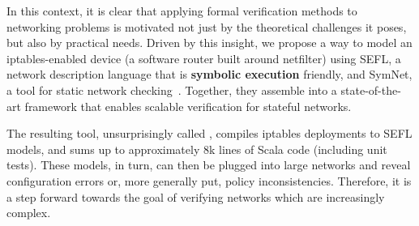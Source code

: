 In this context, it is clear that applying formal verification methods to
networking problems is motivated not just by the theoretical challenges it
poses, but also by practical needs.  Driven by this insight, we propose a way
to model an iptables-enabled device (a software router built around netfilter)
using SEFL, a network
description language that is \textbf{symbolic execution} friendly, and SymNet,
a tool for static network checking~\cite{stoenescu2016symnet,
stoenescu2013symnet}.  Together, they assemble into a state-of-the-art
framework that enables scalable verification for stateful networks.

The resulting tool, unsurprisingly called \TOOL, compiles iptables deployments
to SEFL models, and sums up to approximately 8k lines of Scala code (including
unit tests).  These models, in turn, can then be plugged into large networks
and reveal configuration errors or, more generally put, policy inconsistencies.
Therefore, it is a step forward towards the goal of verifying networks which
are increasingly complex.





